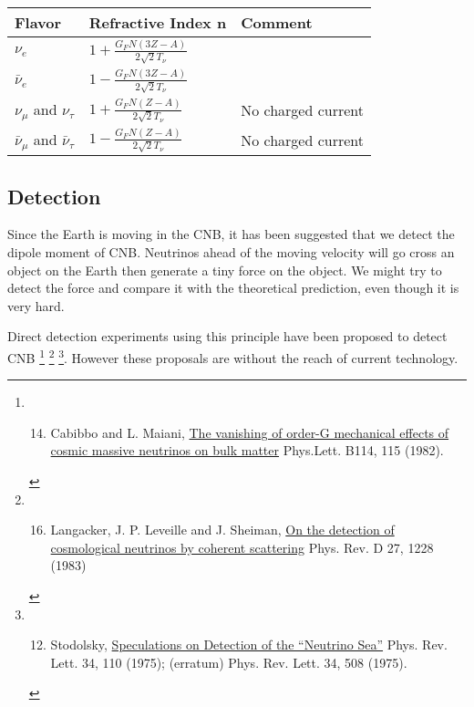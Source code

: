 \documentclass[letterpaper,12pt,english]{sphinxmanual}
\begin{document}
\begin{tabulary}{\linewidth}{|L|L|L|}
\hline

Flavor
 & 
Refractive Index n
 & 
Comment
\\
\hline
\(\nu_e\)
 & 
\(1+\frac{G_F N (3Z-A)}{2\sqrt{2}T_\nu}\)
 & \\
\hline
\(\bar\nu_e\)
 & 
\(1-\frac{G_F N (3Z-A)}{2\sqrt{2}T_\nu}\)
 & \\
\hline
\(\nu_\mu\) and \(\nu_\tau\)
 & 
\(1+\frac{G_F N (Z-A)}{2\sqrt{2}T_\nu}\)
 & 
No charged current
\\
\hline
\(\bar\nu_\mu\) and \(\bar\nu_\tau\)
 & 
\(1-\frac{G_F N (Z-A)}{2\sqrt{2}T_\nu}\)
 & 
No charged current
\\
\hline\end{tabulary}



\subsection{Detection}
\label{cosmology:detection}
Since the Earth is moving in the CNB, it has been suggested that we detect the dipole moment of CNB. Neutrinos ahead of the moving velocity will go cross an object on the Earth then generate a tiny force on the object. We might try to detect the force and compare it with the theoretical prediction, even though it is very hard.

Direct detection experiments using this principle have been proposed to detect CNB \footnote[2]{\begin{enumerate}
\setcounter{enumi}{13}
\item {} 
Cabibbo and L. Maiani, \href{http://www.sciencedirect.com/science/article/pii/0370269382901277}{The vanishing of order-G mechanical effects of cosmic massive neutrinos on bulk matter} Phys.Lett. B114, 115 (1982).

\end{enumerate}
} \footnote[3]{\begin{enumerate}
\setcounter{enumi}{15}
\item {} 
Langacker, J. P. Leveille and J. Sheiman, \href{http://journals.aps.org/prd/abstract/10.1103/PhysRevD.27.1228}{On the detection of cosmological neutrinos by coherent scattering} Phys. Rev. D 27, 1228 (1983)

\end{enumerate}
} \footnote[4]{\begin{enumerate}
\setcounter{enumi}{11}
\item {} 
Stodolsky, \href{http://journals.aps.org/prl/abstract/10.1103/PhysRevLett.34.110}{Speculations on Detection of the ``Neutrino Sea''} Phys. Rev. Lett. 34, 110 (1975); (erratum) Phys. Rev. Lett. 34, 508 (1975).

\end{enumerate}
}. However these proposals are without the reach of current technology. \footnotemark[1]
\end{document}
